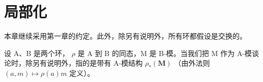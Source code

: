 \chapter{局部化}

本章继续采用第一章的约定。此外，除另有说明外，所有环都假设是交换的。

设 A、B 是两个环， \(\rho\) 是 A 到 B 的同态，M 是 B-模。当我们把 M 作为 A-模谈论时，除另有说明外，指的是带有 A-模结构 \(\rho_{*}(\mathbf{M})\) （由外法则 \((a,m)\mapsto\rho(a)m\) 定义）。

